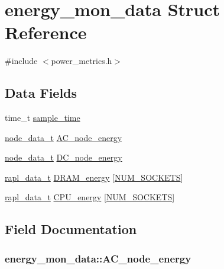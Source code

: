 \hypertarget{structenergy__mon__data}{}\section{energy\+\_\+mon\+\_\+data Struct Reference}
\label{structenergy__mon__data}


{\ttfamily \#include $<$power\+\_\+metrics.\+h$>$}

\subsection*{Data Fields}
\begin{DoxyCompactItemize}
\item 
time\+\_\+t \hyperlink{structenergy__mon__data_a1d6dcfd4286ede4a8bd270433a2203d0}{sample\+\_\+time}
\item 
\hyperlink{power__metrics_8h_aacae91a2caffb1214de1a2f5694b8c51}{node\+\_\+data\+\_\+t} \hyperlink{structenergy__mon__data_a48d1f27c275ffecaf6aebf5af76d1080}{A\+C\+\_\+node\+\_\+energy}
\item 
\hyperlink{power__metrics_8h_aacae91a2caffb1214de1a2f5694b8c51}{node\+\_\+data\+\_\+t} \hyperlink{structenergy__mon__data_ae5e6cf62edbf30b79410d3890c31a15b}{D\+C\+\_\+node\+\_\+energy}
\item 
\hyperlink{power__metrics_8h_ae129c807333e7e239f56d9413d00d48d}{rapl\+\_\+data\+\_\+t} \hyperlink{structenergy__mon__data_ab1fa0dad6895713ce093f8422e4b2701}{D\+R\+A\+M\+\_\+energy} \mbox{[}\hyperlink{power__metrics_8h_a1c803e4ececfb47d2791c9283c85eb00}{N\+U\+M\+\_\+\+S\+O\+C\+K\+E\+TS}\mbox{]}
\item 
\hyperlink{power__metrics_8h_ae129c807333e7e239f56d9413d00d48d}{rapl\+\_\+data\+\_\+t} \hyperlink{structenergy__mon__data_a764fefe8935c91ebd879060fec354f5b}{C\+P\+U\+\_\+energy} \mbox{[}\hyperlink{power__metrics_8h_a1c803e4ececfb47d2791c9283c85eb00}{N\+U\+M\+\_\+\+S\+O\+C\+K\+E\+TS}\mbox{]}
\end{DoxyCompactItemize}


\subsection{Field Documentation}
\subsubsection[{\texorpdfstring{A\+C\+\_\+node\+\_\+energy}{AC_node_energy}}]{ energy\+\_\+mon\+\_\+data\+::\+A\+C\+\_\+node\+\_\+energy}\hypertarget{structenergy__mon__data_a48d1f27c275ffecaf6aebf5af76d1080}{}\label{structenergy__mon__data_a48d1f27c275ffecaf6aebf5af76d1080}
